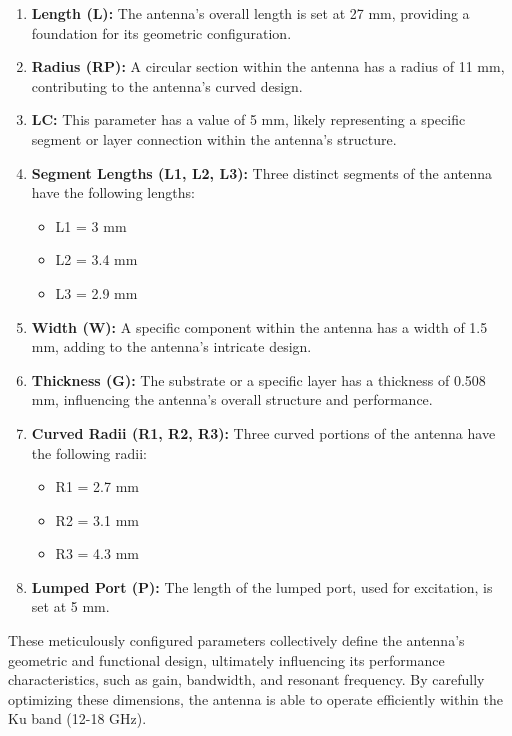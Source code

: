 \documentclass[12pt]{article}
\begin{document}
\begin{enumerate}
    \item \textbf{Length (L):} The antenna's overall length is set at 27 mm, providing a foundation for its geometric configuration.

    \item \textbf{Radius (RP):} A circular section within the antenna has a radius of 11 mm, contributing to the antenna's curved design.

    \item \textbf{LC:} This parameter has a value of 5 mm, likely representing a specific segment or layer connection within the antenna's structure.

    \item \textbf{Segment Lengths (L1, L2, L3):} Three distinct segments of the antenna have the following lengths:
    \begin{itemize}
        \item L1 = 3 mm
        \item L2 = 3.4 mm
        \item L3 = 2.9 mm
    \end{itemize}

    \item \textbf{Width (W):} A specific component within the antenna has a width of 1.5 mm, adding to the antenna's intricate design.

    \item \textbf{Thickness (G):} The substrate or a specific layer has a thickness of 0.508 mm, influencing the antenna's overall structure and performance.

    \item \textbf{Curved Radii (R1, R2, R3):} Three curved portions of the antenna have the following radii:
    \begin{itemize}
        \item R1 = 2.7 mm
        \item R2 = 3.1 mm
        \item R3 = 4.3 mm
     \end{itemize}

     \item \textbf{Lumped Port (P):} The length of the lumped port, used for excitation, is set at 5 mm.

     \end{enumerate}

\par These meticulously configured parameters collectively define the antenna's geometric and functional design, ultimately influencing its performance characteristics, such as gain, bandwidth, and resonant frequency. By carefully optimizing these dimensions, the antenna is able to operate efficiently within the Ku band (12-18 GHz).
\end{document}
